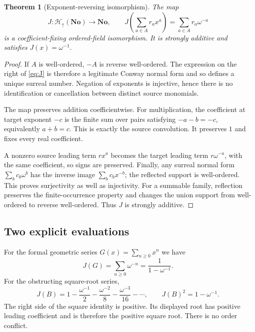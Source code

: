 \documentclass[11pt,letterpaper]{article}
\newtheorem{theorem}{Theorem}[section]
\theoremstyle{definition}
\theoremstyle{remark}
\newcommand{\No}{\mathbf{No}}
\newcommand{\Hfull}{\mathcal H_{\uparrow}(\No)}
\begin{document}
\begin{theorem}[Exponent-reversing isomorphism]\label{thm:reversal}
The map
\begin{equation}\label{eq:J}
 J:\Hfull\longrightarrow\No,
 \qquad J\left(\sum_{a\in A}r_ax^a\right)
       =\sum_{a\in A}r_a\omega^{-a}
\end{equation}
is a coefficient-fixing ordered-field isomorphism. It is strongly additive
and satisfies $J(x)=\omega^{-1}$.
\end{theorem}
\begin{proof}
If $A$ is well-ordered, $-A$ is reverse well-ordered. The expression on the
right of \eqref{eq:J} is therefore a legitimate Conway normal form and so
defines a unique surreal number. Negation of exponents is injective, hence
there is no identification or cancellation between distinct source monomials.

The map preserves addition coefficientwise. For multiplication, the
coefficient at target exponent $-c$ is the finite sum over pairs satisfying
$-a-b=-c$, equivalently $a+b=c$. This is exactly the source convolution.
It preserves $1$ and fixes every real coefficient.

A nonzero source leading term $r x^a$ becomes the target leading term
$r\omega^{-a}$, with the same coefficient, so signs are preserved. Finally,
any surreal normal form $\sum_b c_b\omega^b$ has the inverse image
$\sum_b c_bx^{-b}$; the reflected support is well-ordered. This proves
surjectivity as well as injectivity. For a summable family, reflection
preserves the finite-occurrence property and changes the union support from
well-ordered to reverse well-ordered. Thus $J$ is strongly additive.
\end{proof}

\subsection{Two explicit evaluations}
For the formal geometric series $G(x)=\sum_{n\ge0}x^n$ we have
\begin{equation}\label{eq:goodgeom}
 J(G)=\sum_{n\ge0}\omega^{-n}=\frac{1}{1-\omega^{-1}}.
\end{equation}
For the obstructing square-root series,
\begin{equation}\label{eq:goodroot}
 J(B)=1-\frac{\omega^{-1}}2-\frac{\omega^{-2}}8
       -\frac{\omega^{-3}}{16}-\cdots,
 \qquad J(B)^2=1-\omega^{-1}.
\end{equation}
The right side of the square identity is positive. Its displayed root has
positive leading coefficient and is therefore the positive square root.
There is no order conflict.
\end{document}
